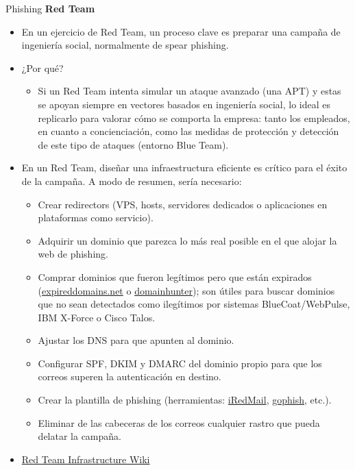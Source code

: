 \documentclass[aspectratio=169,11pt]{beamer}
\newcommand{\lead}[1]{{\color{uznavy}\bfseries #1}\par\smallskip}
\begin{document}
\begin{frame}[allowframebreaks]{Phishing}
\small
\lead{Red Team}
  \begin{itemize}
  \item En un ejercicio de Red Team, un proceso clave es preparar una campaña de ingeniería social, normalmente de spear phishing.
  \item ¿Por qué?
    \begin{itemize}
    \item Si un Red Team intenta simular un ataque avanzado (una APT) y estas se apoyan siempre en vectores basados en ingeniería social, lo ideal es replicarlo para valorar cómo se comporta la empresa: tanto los empleados, en cuanto a concienciación, como las medidas de protección y detección de este tipo de ataques (entorno Blue Team).
    \end{itemize}
  \item En un Red Team, diseñar una infraestructura eficiente es crítico para el éxito de la campaña. A modo de resumen, sería necesario:
    \begin{itemize}
    \item Crear redirectors (VPS, hosts, servidores dedicados o aplicaciones en plataformas como servicio).
    \item Adquirir un dominio que parezca lo más real posible en el que alojar la web de phishing.
    \item Comprar dominios que fueron legítimos pero que están expirados (\href{https://www.expireddomains.net}{expireddomains.net} o \href{https://github.com/minisllc/domainhunter}{domainhunter}); son útiles para buscar dominios que no sean detectados como ilegítimos por sistemas BlueCoat/WebPulse, IBM X-Force o Cisco Talos.
    \item Ajustar los DNS para que apunten al dominio.
    \item Configurar SPF, DKIM y DMARC del dominio propio para que los correos superen la autenticación en destino.
    \item Crear la plantilla de phishing (herramientas: \href{https://www.iredmail.org/}{iRedMail}, \href{https://getgophish.com/}{gophish}, etc.).
    \item Eliminar de las cabeceras de los correos cualquier rastro que pueda delatar la campaña.
    \end{itemize}
  \item \href{https://github.com/bluscreenofjeff/Red-Team-Infrastructure-Wiki}{Red Team Infrastructure Wiki}
  \end{itemize}
\end{frame}
\end{document}
